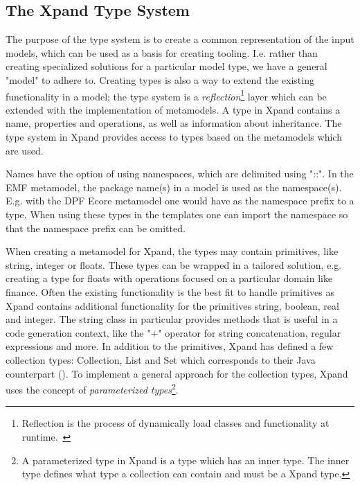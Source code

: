 \subsection{The Xpand Type System}\label{sub:type_system}
The purpose of the type system is to create a common representation of the input models, which can be used as a basis for creating tooling. I.e. rather than creating specialized solutions for a particular model type, we have a general "model" to adhere to. Creating types is also a way to extend the existing functionality in a model; the type system is a \emph{reflection}\footnote{Reflection is the process of dynamically load classes and functionality at runtime.~\cite{reflection_tutorial}} layer which can be extended with the implementation of metamodels. A type in Xpand contains a name, properties and operations, as well as information about inheritance. The type system in Xpand provides access to types based on the metamodels which are used.

Names have the option of using namespaces, which are delimited using "::". In the EMF metamodel, the package name(s) in a model is used as the namespace(s). E.g. with the DPF Ecore metamodel one would have  as the namespace prefix to a type. When using these types in the templates one can import the namespace so that the namespace prefix can be omitted.

When creating a metamodel for Xpand, the types may contain primitives, like string, integer or floats. These types can be wrapped in a tailored solution, e.g. creating a type for floats with operations focused on a particular domain like finance. Often the existing functionality is the best fit to handle primitives as Xpand contains additional functionality for the primitives string, boolean, real and integer. The string class in particular provides methods that is useful in a code generation context, like the "+" operator for string concatenation, regular expressions and more. In addition to the primitives, Xpand has defined a few collection types: Collection, List and Set which corresponds to their Java counterpart (). To implement a general approach for the collection types, Xpand uses the concept of \emph{parameterized types}\footnote{A parameterized type in Xpand is a type which has an inner type. The inner type defines what type a collection can contain and must be a Xpand type.}.


